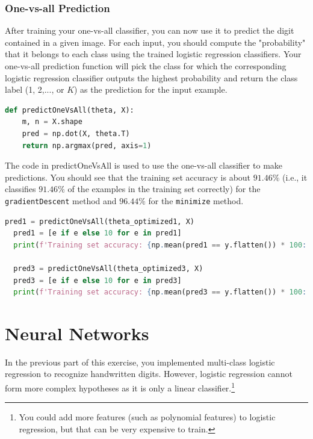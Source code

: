 \documentclass[12pt]{article}
\begin{document}
\subsubsection{One-vs-all Prediction}

After training your one-vs-all classifier, you can now use it to predict the digit contained in a given image. For each input, you should compute the "probability" that it belongs to each class using the trained logistic regression classifiers. Your one-vs-all prediction function will pick the class for which the corresponding logistic regression classifier outputs the highest probability and return the class label (1, 2,..., or $K$) as the prediction for the input example.

\begin{lstlisting}[language=Python]
  def predictOneVsAll(theta, X):
    m, n = X.shape
    pred = np.dot(X, theta.T)
    return np.argmax(pred, axis=1)
\end{lstlisting}

The code in predictOneVsAll is used to use the one-vs-all classifier to make predictions. You should see that the training set accuracy is about $91.46\%$ (i.e., it classifies $91.46\%$ of the examples in the training set correctly) for the \texttt{gradientDescent} method and $96.44\%$ for the \texttt{minimize} method.

\begin{lstlisting}[language=Python]
  pred1 = predictOneVsAll(theta_optimized1, X)
  pred1 = [e if e else 10 for e in pred1]
  print(f'Training set accuracy: {np.mean(pred1 == y.flatten()) * 100:.4f}%')

  pred3 = predictOneVsAll(theta_optimized3, X)
  pred3 = [e if e else 10 for e in pred3]
  print(f'Training set accuracy: {np.mean(pred3 == y.flatten()) * 100:.4f}%')
\end{lstlisting}



\section{Neural Networks}

In the previous part of this exercise, you implemented multi-class logistic regression to recognize handwritten digits. However, logistic regression cannot form more complex hypotheses as it is only a linear classifier.\footnote{You could add more features (such as polynomial features) to logistic regression, but that can be very expensive to train.}
\end{document}
